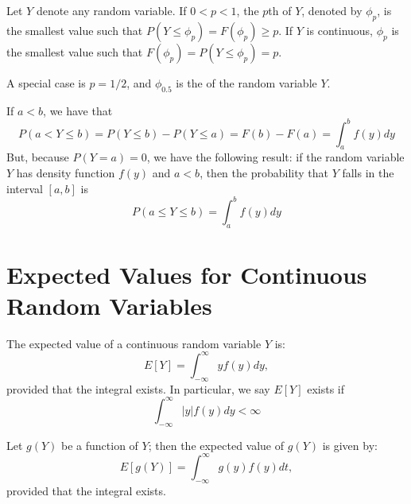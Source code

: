 \documentclass[12pt, a4paper, twoside, openright, titlepage]{book}
\begin{document}
\begin{defn}{}{}
    Let $Y$ denote any random variable. If $0 < p < 1$, the $p$th  of $Y$, denoted by $\phi_p$, is the smallest value such that $P(Y \leq \phi_p) = F(\phi_p) \geq p$. If $Y$ is continuous, $\phi_p$ is the smallest value such that $F(\phi_p) = P(Y\leq \phi_p) = p$. 
\end{defn}

A special case is $p = 1/2$, and $\phi_{0.5}$ is the  of the random variable $Y$.


\begin{thm}{}{}
    If $a < b$, we have that \begin{equation*}
        P(a<Y\leq b) = P(Y\leq b) - P(Y\leq a) = F(b) - F(a) = \int_a^bf(y)dy
    \end{equation*}
    But, because $P(Y=a) = 0$, we have the following result: if the random variable $Y$ has density function $f(y)$ and $a < b$, then the probability that $Y$ falls in the interval $[a,b]$ is \begin{equation*}
        P(a\leq Y \leq b) = \int_a^bf(y)dy
    \end{equation*}
\end{thm}



\section{\textsection Expected Values for Continuous Random Variables}

\begin{defn}{}{}
    The expected value of a continuous random variable $Y$ is: \begin{equation*}
        E[Y] = \int_{-\infty}^{\infty}yf(y)dy,
    \end{equation*}
    provided that the integral exists. In particular, we say $E[Y]$ exists if \begin{equation*}
        \int_{-\infty}^{\infty}|y|f(y)dy < \infty
    \end{equation*}
\end{defn}

\begin{thm}{}{}
    Let $g(Y)$ be a function of $Y$; then the expected value of $g(Y)$ is given by: \begin{equation*}
        E[g(Y)] = \int_{-\infty}^{\infty}g(y)f(y)dt,
    \end{equation*}
    provided that the integral exists.
\end{thm}
\end{document}
